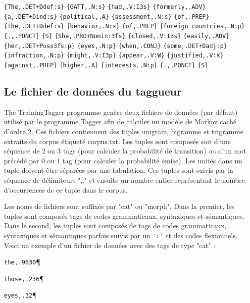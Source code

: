 \bigskip
\verb${The,.DET+Ddef:s}$ \verb${GATT,.N:s}$ \verb${had,.V:I3s}$ \verb${formerly,.ADV}$\\ 
\verb${a,.DET+Dind:s}$ \verb${political,.A}$ \verb${assessment,.N:s}$ \verb${of,.PREP}$\\ 
\verb${the,.DET+Ddef:s}$ \verb${behavior,.N:s}$ \verb${of,.PREP}$ \verb${foreign countries,.N:p}$\\ 
\verb${.,.PONCT}$ \verb${S}$ \verb${She,.PRO+Nomin:3fs}$ \verb${closed,.V:I3s}$ \verb${easily,.ADV}$\\
\verb${her,.DET+Poss3fs:p}$ \verb${eyes,.N:p}$ \verb${when,.CONJ}$ \verb${some,.DET+Dadj:p}$\\
\verb${infraction,.N:p}$ \verb${might,.V:I3p}$ \verb${appear,.V:W}$ \verb${justified,.V:K}$\\
\verb${against,.PREP}$ \verb${higher,.A}$ \verb${interests,.N:p}$ \verb${.,.PONCT}$ \verb${S}$

\subsection{Le fichier de données du taggueur}
\label{section-training-dict}
The TrainingTagger programme  genère deux fichiers de données (par défaut) utilisé par le programme
Tagger afin de calculer un modèle de Markov caché d'ordre 2. Ces fichiers contiennent des tuples
unigram, bigramme et trigramme extraits du corpus étiqueté corpus.txt. Les tuples sont composés soit
d'une séquence de 2 ou 3 tags (pour calculer la probabilité de transition) ou d'un mot précédé par 0
ou 1 tag (pour calculer la probabilité émise). Les unités dans un tuple doivent être séparées par
une tabulation. Ces tuples sont suivis par la séquence de délimiteurs ",." et ensuite un nombre
entier représentant le nombre d'occurrences de ce tuple dans le corpus.

\bigskip

\noindent Les noms de fichiers sont suffixés par "cat" ou "morph". Dans la premier, les tuples sont
composés tags de codes grammaticaux, syntaxiques et sémantiques. Dans le second, les tuples sont
composés de tags de codes grammaticaux, syntaxiques et sémantiques parfois suivis par un
\verb+':'+ et des codes flexionnels.
Voici un exemple d'un fichier de données avec des tags de type "cat" :

\bigskip
\verb+the,.9630+\P

\verb+those,.236+\P

\verb+eyes,.32+\P

